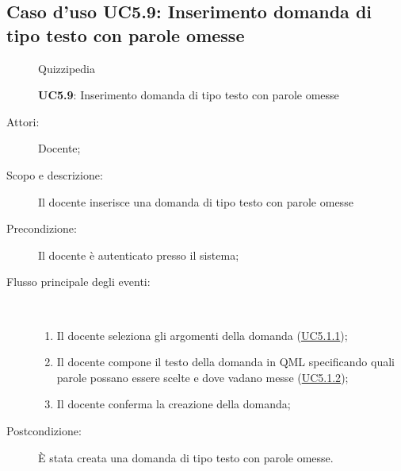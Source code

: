 \subsection{Caso d'uso UC5.9: Inserimento domanda di tipo testo con parole omesse}
	\begin{figure}[H]
		\centering
		\begin{resizedtikzpicture}{\textwidth}
		\begin{umlsystem}[x=0, fill=lightgray!20]{Quizzipedia}
		\end{umlsystem}
		\end{resizedtikzpicture}
		\caption{\textbf{UC5.9}: Inserimento domanda di tipo testo con parole omesse}
		\label{UC5.9}
	\end{figure}
\begin{description}
\item[Attori:] Docente;
\item[Scopo e descrizione:] Il docente inserisce una domanda di tipo testo con parole omesse
      \item[Precondizione:] Il docente è autenticato presso il sistema;

        \item[Flusso principale degli eventi:] \ 
 \begin{enumerate}
          \item Il docente seleziona gli argomenti della domanda (\hyperlink{UC5.1.1}{UC5.1.1});
          \item Il docente compone il testo della domanda in QML specificando quali parole possano essere scelte e dove vadano messe  (\hyperlink{UC5.1.2}{UC5.1.2});
          \item Il docente conferma la creazione della domanda;

      \end{enumerate}
    \item[Postcondizione:] È stata creata una domanda di tipo testo con parole omesse.
  \end{description}
\hypertarget{UC5.10}{}
